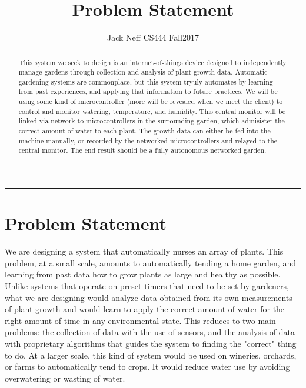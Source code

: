 \documentclass[letterpaper, 10pt, fleqn]{article}
\title{Problem Statement}
\author{Jack Neff CS444 Fall2017}
\begin{document}
\maketitle
\hrule
\pagebreak

\begin{abstract}
	This system we seek to design is an internet-of-things device designed to independently manage gardens through collection and analysis of plant growth data. Automatic gardening systems are commonplace, but this system tryuly automates by learning from past experiences, and applying that information to future practices. We will be using some kind of microcontroller (more will be revealed when we meet the client) to control and monitor watering, temperature, and humidity. This central monitor will be linked via network to microcontrollers in the surrounding garden, which admisister the correct amount of water to each plant. The growth data can either be fed into the machine manually, or recorded by the networked microcontrollers and relayed to the central monitor. The end result should be a fully autonomous networked garden. 
\end{abstract}

\section{Problem Statement}
	 

	We are designing a system that automatically nurses an array of plants. This problem, at a small scale, amounts to automatically tending a home garden, and learning from past data how to grow plants as large and healthy as possible. Unlike systems that operate on preset timers that need to be set by gardeners, what we are designing would analyze data obtained from its own measurements of plant growth and would learn to apply the correct amount of water for the right amount of time in any environmental state. This reduces to two main problems: the collection of data with the use of sensors, and the analysis of data with proprietary algorithms that guides the system to finding the "correct" thing to do. At a larger scale, this kind of system would be used on wineries, orchards, or farms to automatically tend to crops. It would reduce water use by avoiding overwatering or wasting of water.    
\end{document}
